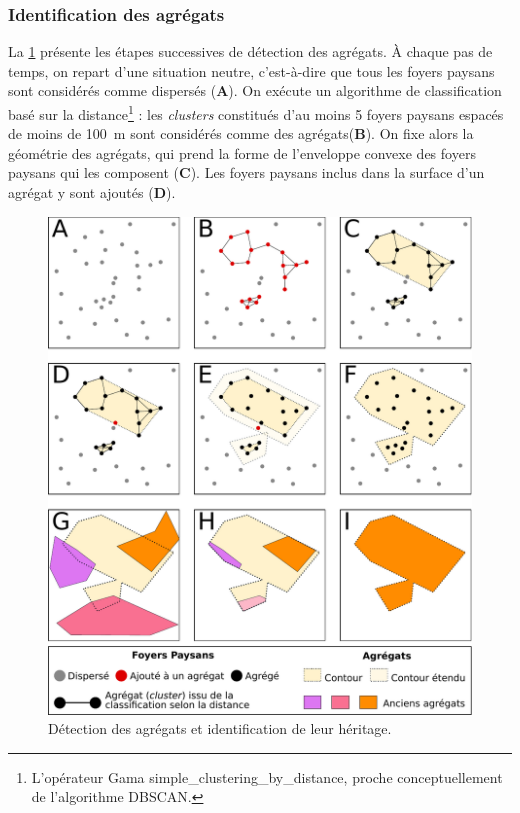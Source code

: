 \subsubsection{Identification des agrégats \label{sssec:agregats}}

La \cref{fig:detection-agregats} présente les étapes successives de détection des agrégats.
À chaque pas de temps, on repart d'une situation \og neutre\fg{}, c'est-à-dire que tous les foyers paysans sont considérés comme dispersés (\textbf{A}).
On exécute un algorithme de classification basé sur la distance\footnote{
	L'opérateur Gama \textsf{simple\_clustering\_by\_distance}, proche conceptuellement de l'algorithme DBSCAN.
} : les \textit{clusters} constitués d'au moins 5 foyers paysans espacés de moins de 100~m sont considérés comme des agrégats(\textbf{B}).
On fixe alors la géométrie des agrégats, qui prend la forme de l'enveloppe convexe des foyers paysans qui les composent (\textbf{C}).
Les foyers paysans inclus dans la surface d'un agrégat y sont ajoutés (\textbf{D}).
	
\begin{figure}[H]
	\centering
	\includegraphics[width=.75\linewidth]{img/detection_agregats.pdf}
	\caption{Détection des agrégats et identification de leur \og héritage\fg{}.}
	\label{fig:detection-agregats}
\end{figure}

